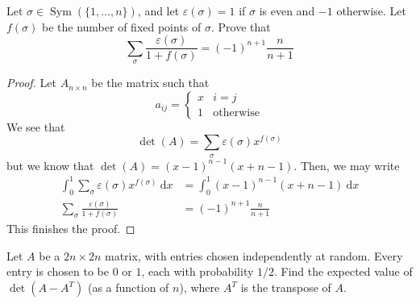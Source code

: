 \begin{example}
    Let $\sigma\in\operatorname{Sym}(\{1,\ldots,n\})$, and let $\varepsilon(\sigma) = 1$ if $\sigma$ is even and $-1$ otherwise. Let $f(\sigma)$ be the number of fixed points of $\sigma$. Prove that 
    \begin{equation*}
        \sum_\sigma\frac{\varepsilon(\sigma)}{1 + f(\sigma)} = (-1)^{n + 1}\frac{n}{n + 1}
    \end{equation*}
\end{example}
\begin{proof}
    Let $A_{n\times n}$ be the matrix such that 
    \begin{equation*}
        a_{ij} = \begin{cases}
            x & i = j\\
            1 & \text{otherwise}
        \end{cases}
    \end{equation*}
    We see that 
    \begin{equation*}
        \det(A) = \sum_{\sigma}\varepsilon(\sigma)x^{f(\sigma)}
    \end{equation*}
    but we know that $\det(A) = (x - 1)^{n - 1}(x + n - 1)$. Then, we may write 
    \begin{align*}
        \int_0^1\sum_{\sigma}\varepsilon(\sigma)x^{f(\sigma)}~\text{d}x &= \int_0^1(x - 1)^{n - 1}(x + n - 1)~\text{d}x\\
        \sum_\sigma\frac{\varepsilon(\sigma)}{1 + f(\sigma)} &= (-1)^{n + 1}\frac{n}{n + 1}
    \end{align*}
    This finishes the proof.
\end{proof}

\begin{example}[Putnam 2016/B4]
   	Let $A$ be a $2n\times 2n$ matrix, with entries chosen independently at random. Every entry is chosen to be $0$ or $1$, each with probability $1/2$. Find the expected value of $\det(A-A^T)$ (as a function of $n$), where $A^T$ is the transpose of $A.$ 
\end{example}